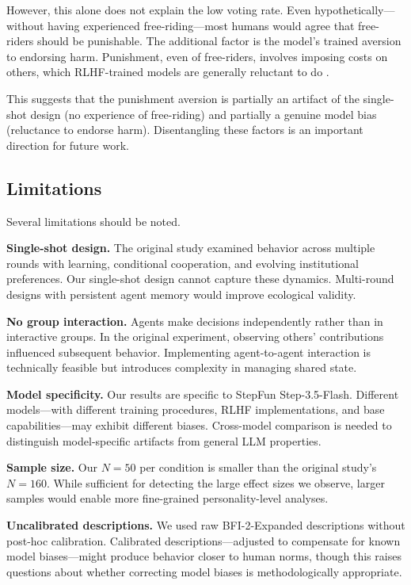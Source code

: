\documentclass[12pt, a4paper]{article}
\begin{document}
However, this alone does not explain the low voting rate. Even hypothetically---without having experienced free-riding---most humans would agree that free-riders should be punishable. The additional factor is the model's trained aversion to endorsing harm. Punishment, even of free-riders, involves imposing costs on others, which RLHF-trained models are generally reluctant to do \citep{salecha2024social}.

This suggests that the punishment aversion is partially an artifact of the single-shot design (no experience of free-riding) and partially a genuine model bias (reluctance to endorse harm). Disentangling these factors is an important direction for future work.

\subsection{Limitations}

Several limitations should be noted.

\textbf{Single-shot design.} The original study examined behavior across multiple rounds with learning, conditional cooperation, and evolving institutional preferences. Our single-shot design cannot capture these dynamics. Multi-round designs with persistent agent memory would improve ecological validity.

\textbf{No group interaction.} Agents make decisions independently rather than in interactive groups. In the original experiment, observing others' contributions influenced subsequent behavior. Implementing agent-to-agent interaction is technically feasible but introduces complexity in managing shared state.

\textbf{Model specificity.} Our results are specific to StepFun Step-3.5-Flash. Different models---with different training procedures, RLHF implementations, and base capabilities---may exhibit different biases. Cross-model comparison is needed to distinguish model-specific artifacts from general LLM properties.

\textbf{Sample size.} Our $N = 50$ per condition is smaller than the original study's $N = 160$. While sufficient for detecting the large effect sizes we observe, larger samples would enable more fine-grained personality-level analyses.

\textbf{Uncalibrated descriptions.} We used raw BFI-2-Expanded descriptions without post-hoc calibration. Calibrated descriptions---adjusted to compensate for known model biases---might produce behavior closer to human norms, though this raises questions about whether correcting model biases is methodologically appropriate.
\end{document}
